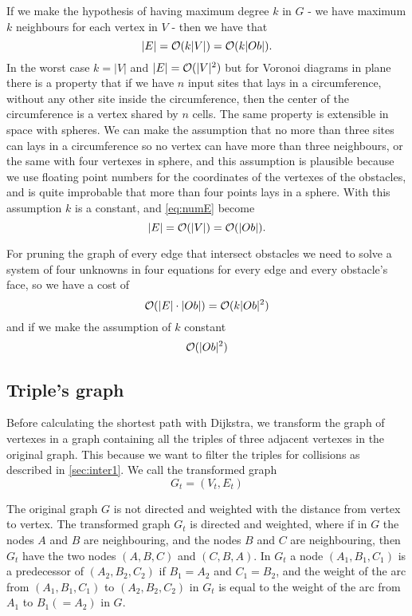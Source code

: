 \documentclass[dissertation.tex]{subfiles}
\begin{document}
If we make the hypothesis of having maximum degree $k$ in $G$ -
we have maximum $k$ neighbours for each vertex in $V$ - then we have
that
\begin{equation}
  \label{eq:numE}
  |E|=\mathcal{O}(k|V|)=\mathcal{O}(k|Ob|).
\end{equation}
In the worst case $k=|V|$ and $|E|=\mathcal{O}(|V|^2)$ but for Voronoi
diagrams in plane there is a property that if we have $n$ input sites
that lays in a circumference, without any other site inside the
circumference, then the center of the circumference is a vertex shared
by $n$ cells. The same property is extensible in space with
spheres. We can make the assumption that no more than three sites can lays
in a circumference so no vertex can have more than three neighbours,
or the same with four vertexes in sphere, and this assumption is
plausible because we use floating point numbers for the coordinates of
the vertexes of the obstacles, and is quite improbable that more than
four points lays in a sphere. With this assumption $k$ is a constant,
and \cref{eq:numE} become
\begin{equation*}
  |E|=\mathcal{O}(|V|)=\mathcal{O}(|Ob|).
\end{equation*}

For pruning the graph of every edge that intersect obstacles we need
to solve a system of four unknowns in four equations for every edge
and every obstacle's face, so we have a cost of
\begin{equation}
  \label{eq:costPruning}
  \mathcal{O}(|E|\cdot|Ob|)=\mathcal{O}(k|Ob|^2)
\end{equation}
and if we make the assumption of $k$ constant
\begin{equation*}
  \mathcal{O}(|Ob|^2)
\end{equation*}

\subsection{Triple's graph}\label{sec:trigraph}
Before calculating the shortest path with Dijkstra, we
transform the graph of vertexes in a graph containing all the triples
of three adjacent vertexes in the original graph. This because we want
to filter the triples for collisions as described in
\cref{sec:inter1}. We call the transformed graph
$$G_t=(V_t,E_t)$$

The original graph $G$ is not directed and weighted
with the distance from vertex to vertex. The transformed graph $G_t$ is
directed and weighted, where if in $G$ the nodes $A$
and $B$ are
neighbouring, and the nodes $B$ and $C$ are neighbouring, then $G_t$
have the two nodes $(A,B,C)$ and $(C,B,A)$. In
$G_t$ a node $(A_1,B_1,C_1)$ is a predecessor of
$(A_2,B_2,C_2)$ if $B_1=A_2$ and $C_1=B_2$, and the weight of the arc
from $(A_1,B_1,C_1)$ to $(A_2,B_2,C_2)$ in $G_t$ is
equal to
the weight of the arc from $A_1$ to $B_1(=A_2)$ in $G$.
\end{document}

